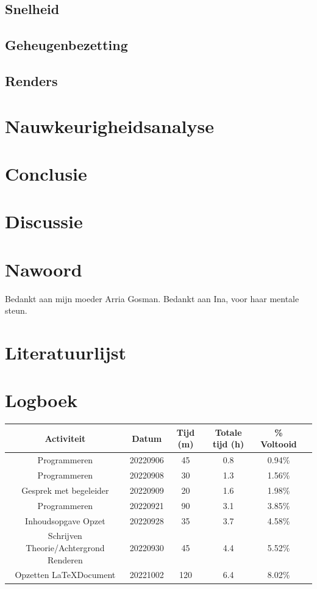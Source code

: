 \documentclass[12pt, a4paper]{article}
\begin{document}
\subsection{Snelheid}
\subsection{Geheugenbezetting}
\subsection{Renders}
\clearpage
\section{Nauwkeurigheidsanalyse}
\clearpage
\section{Conclusie}
\clearpage
\section{Discussie}
\clearpage
\section{Nawoord}
Bedankt aan mijn moeder Arria Gosman.
Bedankt aan Ina, voor haar mentale steun.
\clearpage
\section{Literatuurlijst}


\clearpage
\section{Logboek}
\begin{adjustbox}{angle=270}
\begin{tabular}{ | c | c c c c c | }
\hline
Activiteit & Datum & Tijd (m) & Totale tijd (h) &       \% Voltooid \\
\hline
Programmeren & 20220906 & 45 & 0.8 & 0.94\% \\
Programmeren & 20220908 & 30 & 1.3 & 1.56\% \\
Gesprek met begeleider & 20220909 & 20 & 1.6 & 1.98\% \\
Programmeren & 20220921 & 90 & 3.1 & 3.85\% \\
Inhoudsopgave Opzet & 20220928 & 35 & 3.7 & 4.58\% \\
Schrijven Theorie/Achtergrond Renderen & 20220930 & 45 & 4.4 & 5.52\% \\
Opzetten \LaTeX \space Document & 20221002 & 120 & 6.4 & 8.02\% \\
\hline
\end{tabular}
\end{adjustbox}
\end{document}
